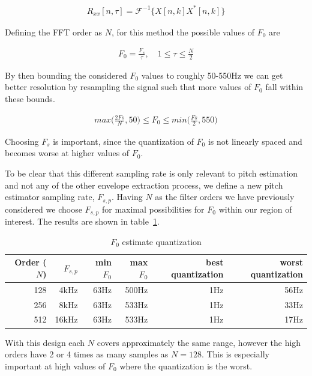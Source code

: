 \documentclass [11pt, proquest] {uwthesis}[2015/03/03]
\begin{document}
\begin{align}
R_{xx}[n,\tau] = \mathcal{F}^{-1}\Big\{X[n,k]X^*[n,k]\Big\}
\end{align}

Defining the FFT order as $N$, for this method the possible values of $F_0$ are 

\begin{align}
F_0 = \frac{F_s}{\tau}, \quad 1 \leq \tau \leq \frac{N}{2}
\end{align}

By then bounding the considered $F_0$ values to roughly 50-550Hz we can get better resolution by resampling the signal such that more values of $F_0$ fall within these bounds.

\begin{align}
max\Big(\frac{2Fs}{N}, 50\Big) \leq F_0 \leq min\Big(\frac{Fs}{2}, 550\Big)
\end{align}

Choosing $F_s$ is important, since the quantization of $F_0$ is not linearly spaced and becomes worse at higher values of $F_0$.

To be clear that this different sampling rate is only relevant to pitch estimation and not any of the other envelope extraction process, we define a new pitch estimator sampling rate, $F_{s,p}$.  Having $N$ as the filter orders we have previously considered we choose $F_{s,p}$ for maximal possibilities for $F_0$ within our region of interest.  The results are shown in table~\ref{table:f0_quantization}.

\begin{table}
\begin{center}
\begin{tabular}{| r | r | r | r | r | r |}
  \hline
  \textbf{Order ($N$)} & \textbf{$F_{s,p}$} &  \textbf{min $F_0$} & \textbf{max $F_0$} &  \textbf{best quantization} &  \textbf{worst quantization} \\ \hline
  128 & 4kHz & 63Hz & 500Hz & 1Hz & 56Hz \\ \hline
  256 & 8kHz & 63Hz & 533Hz & 1Hz & 33Hz \\ \hline
  512 & 16kHz & 63Hz & 533Hz & 1Hz & 17Hz \\ \hline
\end{tabular}
\end{center}
\caption{$F_0$ estimate quantization}\label{table:f0_quantization}
\end{table}

With this design each $N$ covers approximately the same range, however the high orders have 2 or 4 times as many samples as $N = 128$.  This is especially important at high values of $F_0$ where the quantization is the worst.
\end{document}
